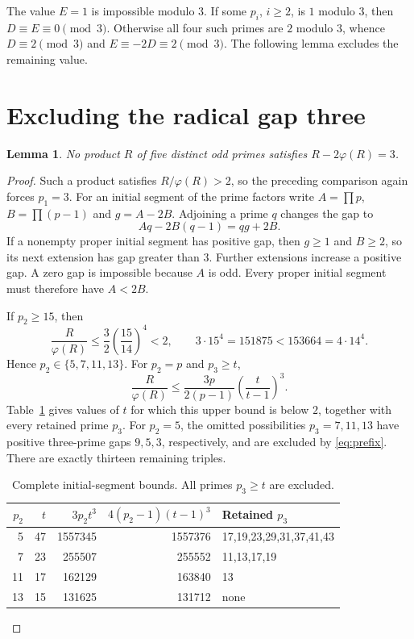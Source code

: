 \documentclass[11pt]{article}
\newtheorem{lemma}[theorem]{Lemma}
\newcommand{\ph}{\varphi}
\begin{document}
The value $E=1$ is impossible modulo $3$. If some $p_i$, $i\ge2$,
is $1$ modulo $3$, then $D\equiv E\equiv0\pmod3$.
Otherwise all four such primes are $2$ modulo $3$, whence
$D\equiv2\pmod3$ and $E\equiv-2D\equiv2\pmod3$.
The following lemma excludes the remaining value.

\section{Excluding the radical gap three}

\begin{lemma}\label{lem:radical}
No product $R$ of five distinct odd primes satisfies
$R-2\ph(R)=3$.
\end{lemma}

\begin{proof}
Such a product satisfies $R/\ph(R)>2$, so the preceding comparison
again forces $p_1=3$.
For an initial segment of the prime factors write
$A=\prod p$, $B=\prod(p-1)$ and $g=A-2B$.
Adjoining a prime $q$ changes the gap to
\begin{equation}\label{eq:prefix}
 Aq-2B(q-1)=qg+2B.
\end{equation}
If a nonempty proper initial segment has positive gap, then $g\ge1$
and $B\ge2$, so its next extension has gap greater than $3$.
Further extensions increase a positive gap. A zero gap is impossible
because $A$ is odd. Every proper initial segment must therefore have
$A<2B$.

If $p_2\ge15$, then
\[
 \frac{R}{\ph(R)}\le\frac32\left(\frac{15}{14}\right)^4<2,
 \qquad 3\cdot15^4=151875<153664=4\cdot14^4.
\]
Hence $p_2\in\{5,7,11,13\}$. For $p_2=p$ and $p_3\ge t$,
\begin{equation}\label{eq:cutoff}
 \frac{R}{\ph(R)}\le
 \frac{3p}{2(p-1)}\left(\frac{t}{t-1}\right)^3.
\end{equation}
Table~\ref{tab:prefixes} gives values of $t$ for which this upper
bound is below $2$, together with every retained prime $p_3$.
For $p_2=5$, the omitted possibilities $p_3=7,11,13$ have positive
three-prime gaps $9,5,3$, respectively, and are excluded by
\eqref{eq:prefix}. There are exactly thirteen remaining triples.

\begin{table}[htbp]
\centering\small
\caption{Complete initial-segment bounds. All primes $p_3\ge t$ are excluded.}
\label{tab:prefixes}
\begin{tabular}{@{}rrrrl@{}}
\toprule
$p_2$ & $t$ & $3p_2t^3$ & $4(p_2-1)(t-1)^3$ & Retained $p_3$\\
\midrule
5 &47&1557345&1557376&17,19,23,29,31,37,41,43\\
7 &23&255507&255552&11,13,17,19\\
11&17&162129&163840&13\\
13&15&131625&131712&none\\
\bottomrule
\end{tabular}
\end{table}


\end{proof}
\end{document}
